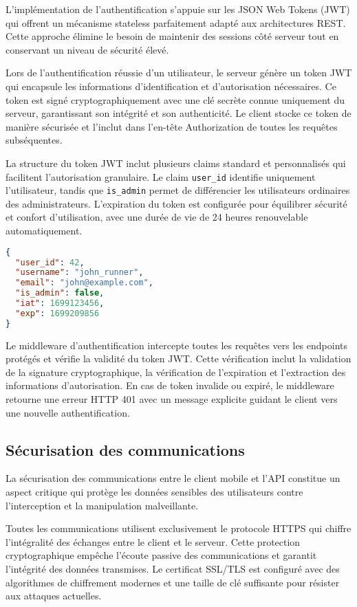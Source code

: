 L'implémentation de l'authentification s'appuie sur les JSON Web Tokens (JWT) qui offrent un mécanisme stateless parfaitement adapté aux architectures REST. Cette approche élimine le besoin de maintenir des sessions côté serveur tout en conservant un niveau de sécurité élevé.

Lors de l'authentification réussie d'un utilisateur, le serveur génère un token JWT qui encapsule les informations d'identification et d'autorisation nécessaires. Ce token est signé cryptographiquement avec une clé secrète connue uniquement du serveur, garantissant son intégrité et son authenticité. Le client stocke ce token de manière sécurisée et l'inclut dans l'en-tête Authorization de toutes les requêtes subséquentes.

La structure du token JWT inclut plusieurs claims standard et personnalisés qui facilitent l'autorisation granulaire. Le claim \texttt{user\_id} identifie uniquement l'utilisateur, tandis que \texttt{is\_admin} permet de différencier les utilisateurs ordinaires des administrateurs. L'expiration du token est configurée pour équilibrer sécurité et confort d'utilisation, avec une durée de vie de 24 heures renouvelable automatiquement.

\begin{lstlisting}[language=json, caption=Structure du payload JWT]
{
  "user_id": 42,
  "username": "john_runner",
  "email": "john@example.com",
  "is_admin": false,
  "iat": 1699123456,
  "exp": 1699209856
}
\end{lstlisting}

Le middleware d'authentification intercepte toutes les requêtes vers les endpoints protégés et vérifie la validité du token JWT. Cette vérification inclut la validation de la signature cryptographique, la vérification de l'expiration et l'extraction des informations d'autorisation. En cas de token invalide ou expiré, le middleware retourne une erreur HTTP 401 avec un message explicite guidant le client vers une nouvelle authentification.

\subsection{Sécurisation des communications}

La sécurisation des communications entre le client mobile et l'API constitue un aspect critique qui protège les données sensibles des utilisateurs contre l'interception et la manipulation malveillante.

Toutes les communications utilisent exclusivement le protocole HTTPS qui chiffre l'intégralité des échanges entre le client et le serveur. Cette protection cryptographique empêche l'écoute passive des communications et garantit l'intégrité des données transmises. Le certificat SSL/TLS est configuré avec des algorithmes de chiffrement modernes et une taille de clé suffisante pour résister aux attaques actuelles.

